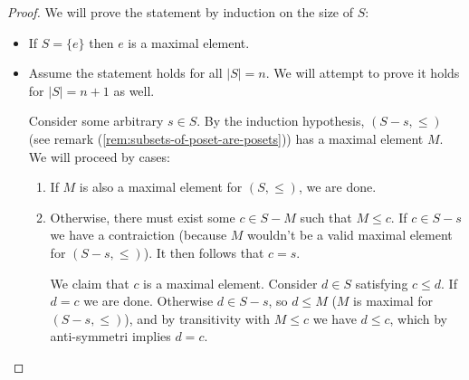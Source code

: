  \begin{proof}
  We will prove the statement by induction on the size of $S$:
  \begin{itemize}
    \item If $S = \{e\}$ then $e$ is a maximal element.
    \item Assume the statement holds for all $|S| = n$. We will attempt to prove it holds for $|S| = n + 1$ as well. 

      Consider some arbitrary $s \in S$. By the induction hypothesis, $(S - s, \leq)$ (see remark (\ref{rem:subsets-of-poset-are-posets})) has a maximal element $M$. We will proceed by cases:
      \begin{enumerate}
        \item If $M$ is also a maximal element for $(S, \leq)$, we are done.
        \item Otherwise, there must exist some $c \in S - M$ such that $M \leq  c$. If $c \in S - s$ we have a contraiction (because $M$ wouldn't be a valid maximal element for $(S - s, \leq )$). It then follows that $c = s$. 

          We claim that $c$ is a maximal element. Consider $d \in S$ satisfying $c \leq d$. If $d = c$ we are done. Otherwise $d \in S - s$, so $d \leq M$ ($M$ is maximal for $(S - s, \leq )$), and by transitivity with $M \leq c$ we have $d \leq c$, which by anti-symmetri implies $d = c$.
      \end{enumerate}
  \end{itemize}
 \end{proof}
